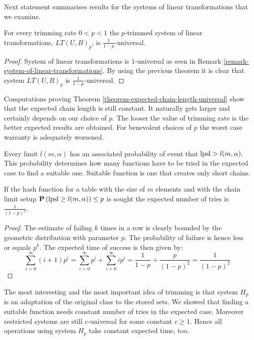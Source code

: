 Next statement summarises results for the systems of linear transformations that we examine.

\begin{corollary}
\label{corollary-trimming-linear}
For every trimming rate $0 < p < 1$ the $p$-trimmed system of linear transformations, $LT(U, B)_p$, is $\frac{1}{1 - p}$-universal.
\end{corollary}
\begin{proof}
System of linear transformations is $1$-universal as seen in Remark \ref{remark-system-of-linear-transformations}. By using the previous theorem it is clear that system $LT(U, B)_p$ is $\frac{1}{1 - p}$-universal.
\end{proof}

Computations proving Theorem \ref{theorem-expected-chain-length-universal} show that the expected chain length is still constant. It naturally gets larger and certainly depends on our choice of $p$. The looser the value of trimming rate is the better expected results are obtained. For benevolent choices of $p$ the worst case warranty is adequately worsened.

Every limit $l(m, \alpha)$ has an associated probability of event that $\mathrm{lpsl} > l(m, \alpha)$. This probability determines how many functions have to be tried in the expected case to find a suitable one. Suitable function is one that creates only short chains.

\begin{lemma}
\label{lemma-linear-transformations-tries}
If the hash function for a table with the size of $m$ elements and with the chain limit setup $\mathbf{P}\left(\mathrm{lpsl} \geq l(m, \alpha)\right) \leq p$ is sought the expected number of tries is $\frac{1}{(1 - p)^2}$.
\end{lemma}
\begin{proof}
The estimate of failing $k$ times in a row is clearly bounded by the geometric distribution with parameter $p$. The probability of failure is hence less or equals $p^k$. The expected time of success is then given by:
\[
\sum_{i = 0}^{\infty} (i + 1)p^i = \sum_{i = 0}^{\infty}p^i + \sum_{i = 0}^{\infty}ip^i = \frac{1}{1 - p} + \frac{p}{(1- p)^2} = \frac{1}{(1 - p)^2}
\]
\end{proof}

The most interesting and the most important idea of trimming is that system $H_p$ is an adaptation of the original class to the stored sets. We showed that finding a suitable function needs constant number of tries in the expected case. Moreover restricted systems are still $c$-universal for some constant $c \geq 1$. Hence all operations using system $H_p$ take constant expected time, too.

